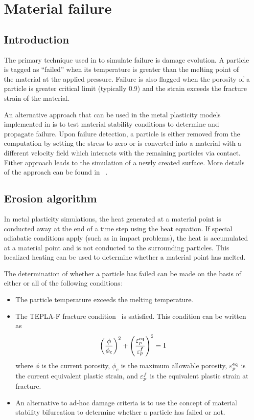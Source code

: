\chapter{Material failure}

\section{Introduction}
The primary technique used in \Vaango to simulate failure is damage evolution.
A particle is tagged as ``failed'' when its temperature is greater than the
melting point of the material at the applied pressure.  Failure is also 
flagged when the porosity of a particle is greater critical limit (typically 0.9)
and the strain exceeds the fracture strain of the material.  

An alternative approach that can be used in the metal plasticity models
implemented in \Vaango is to test material stability conditions 
to determine and propagate failure.  Upon failure detection,
a particle is either removed from the computation by setting the stress to
zero or is converted into a material with a different velocity field 
which interacts with the remaining particles via contact.  Either approach
leads to the simulation of a newly created surface.  More details of the
approach can be found in ~\cite{Banerjee2004a,Banerjee2004c,Banerjee2005}.

\section{Erosion algorithm}
In metal plasticity simulations, the heat generated at a material point is conducted 
away at the end of a time step using the heat equation.  If special adiabatic 
conditions apply (such as in impact problems), the heat is accumulated at a 
material point and is not conducted to the surrounding particles.  This 
localized heating can be used to determine whether a material point has
melted.

The determination of whether a particle has failed can be made on the 
basis of either or all of the following conditions:
\begin{itemize}
  \item The particle temperature exceeds the melting temperature.
  \item The TEPLA-F fracture condition~\cite{Johnson1988} is satisfied.
     This condition can be written as
     \begin{equation}
       \left(\frac{\phi}{\phi_c}\right)^2 + 
       \left(\frac{\varepsilon_p^{\text{eq}}}{\varepsilon_p^f}\right)^2 = 1
     \end{equation}
     where $\phi$ is the current porosity, $\phi_c$ is the maximum 
     allowable porosity, $\varepsilon_p^{\text{eq}}$ is the current equivalent plastic strain, and
     $\varepsilon_p^f$ is the equivalent plastic strain at fracture.
  \item An alternative to ad-hoc damage criteria is to use the concept of 
     material stability bifurcation to determine whether a particle has 
     failed or not.
\end{itemize}

